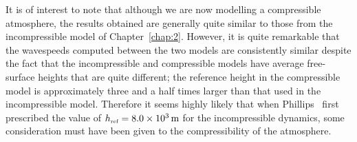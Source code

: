 It is of interest to note that although we are now modelling a compressible atmosphere, the results obtained are generally quite similar to those from the incompressible model of Chapter~\ref{chap:2}. However, it is quite remarkable that the wavespeeds computed between the two models are consistently similar despite the fact that the incompressible and compressible models have average free-surface heights that are quite different; the reference height in the compressible model is approximately three and a half times larger than that used in the incompressible model. Therefore it seems highly likely that when Phillips~\cite{Phillips:NIP} first prescribed the value of $h_{\mbox{\tiny ref}}=8.0\times10^{3}\,\text{m}$ for the incompressible dynamics, some consideration must have been given to the compressibility of the atmosphere.

